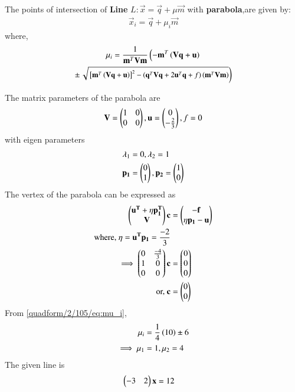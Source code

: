 \begin{lemma}
The points of intersection of \textbf{Line} $L:\vec{x}=\vec{q}+\mu\vec{m}$ with \textbf{parabola},are given by:
\begin{align}
\vec{x}_i = \vec{q}+\mu_i\vec{m}
\end{align}
%
where,
\begin{multline}
\mu_i = \frac{1}
{
\mathbf{m}^T\mathbf{V}\mathbf{m}
}
\left(-\mathbf{m}^T\left(\mathbf{V}\mathbf{q}+\mathbf{u}\right)\right.
\\
\pm
{\small
\ensuremath{\left.\sqrt{
{}\left[
\mathbf{m}^T\left(\mathbf{V}\mathbf{q}+\mathbf{u}\right)
\right]^2
-
\left(
\mathbf{q}^T\mathbf{V}\mathbf{q} + 2\mathbf{u}^T\mathbf{q} +f
\right)
\left(\mathbf{m}^T\mathbf{V}\mathbf{m}\right)
}
\right)}
}\label{quadform/2/105/eq:mu_i}
\end{multline}
\end{lemma}
 The matrix parameters of the parabola are
\begin{align}
\mathbf{V}=\begin{pmatrix}1&0\\0&0\end{pmatrix},\mathbf{u}=\begin{pmatrix}0\\-\frac{2}{3}\end{pmatrix},f=0 \label{quadform/2/105/eq:v}
\end{align}
with eigen parameters 
\begin{align}
\lambda_1 &= 0 , \lambda_2 = 1
\\
\mathbf{p_1} &= \begin{pmatrix}0 \\ 1\end{pmatrix},
\mathbf{p_2} = \begin{pmatrix}1 \\ 0\end{pmatrix}
\end{align}
The vertex of the parabola can be expressed as
\begin{align} \begin{pmatrix}\mathbf{u^T}+\eta\mathbf{p_1^T}\\\mathbf{V} \end{pmatrix}\mathbf{c} &= \begin{pmatrix}\mathbf{-f}\\\eta \mathbf{p_1} -\mathbf{u}\end{pmatrix}
\\
\text{where, }  \eta = \mathbf{u^T}\mathbf{p_1} = \frac{-2}{3}
\\
\implies\begin{pmatrix}0 & \frac{-4}{3}\\1 & 0 \\0 & 0\end{pmatrix} \mathbf{c}&= \begin{pmatrix}0\\0\\0\end{pmatrix}
\\
\text{or, }
   \mathbf{c} &= \begin{pmatrix}0 \\ 0\end{pmatrix}
\end{align}
From  \eqref{quadform/2/105/eq:mu_i},
\begin{align}
\mu_i &= \frac{1}{4}
\left(10\right)
\pm{6}
\\
\implies \mu_1 &= 1, \mu_2 =4
\end{align}
The given line is
\begin{align} 
\begin{pmatrix}-3&2\end{pmatrix}\mathbf{x}&=12
\end{align}
